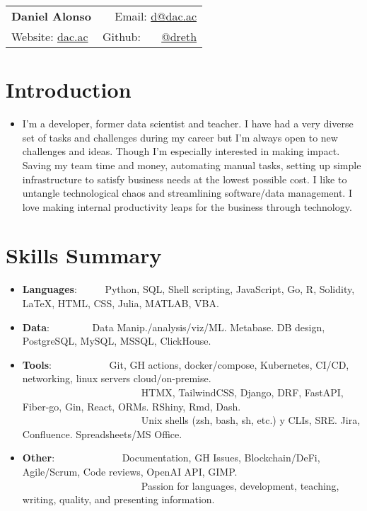 \documentclass[a4paper,20pt]{article}
\newcommand{\resumeItem}[2]{
  \item\small{
    \textbf{#1}{: #2 \vspace{-2pt}}
  }
}
\newcommand{\resumeSubItem}[2]{\resumeItem{#1}{#2}\vspace{-3pt}}
\newcommand{\resumeSubHeadingListStart}{\begin{itemize}[leftmargin=*]}
\newcommand{\resumeSubHeadingListEnd}{\end{itemize}}
\begin{document}
\begin{tabular*}{\textwidth}{l@{\extracolsep{\fill}}r}
  \textbf{{\LARGE Daniel Alonso}} & Email: {\color{blue}\href{mailto:}{d@dac.ac}}\\
  Website: {\color{blue}\href{https://dac.ac}{dac.ac}} & Github: ~~~{\color{blue}\href{https://github.com/dreth}{@dreth}}
\end{tabular*}




            
\vspace{-3pt}
\section{Introduction}
{\begin{itemize} \itemsep-0.24em
\item {I'm a developer, former data scientist and teacher. I have had a very diverse set of tasks and challenges during my career but I'm always open to new challenges and ideas. Though I'm especially interested in making impact. Saving my team time and money, automating manual tasks, setting up simple infrastructure to satisfy business needs at the lowest possible cost. I like to untangle technological chaos and streamlining software/data management. I love making internal productivity leaps for the business through technology.}
\end{itemize}}
        


            
\vspace{-3pt}
\section{Skills Summary}
  \resumeSubHeadingListStart
            
        
\vspace{-1pt}
\resumeSubItem{Languages}{~~~~~Python, SQL, Shell scripting, JavaScript, Go, R, Solidity, LaTeX, HTML, CSS, Julia, MATLAB, VBA.}
\vspace{-1pt}
\resumeSubItem{Data}{~~~~~~~~Data Manip./analysis/viz/ML. Metabase. DB design, PostgreSQL, MySQL, MSSQL, ClickHouse.}
\vspace{-1pt}
\resumeSubItem{Tools}{~~~~~~~~~~~Git, GH actions, docker/compose, Kubernetes, CI/CD, networking, linux servers cloud/on-premise.\\~~~~~~~~~~~~~~~~~~~~~~~~HTMX, TailwindCSS, Django, DRF, FastAPI, Fiber-go, Gin, React, ORMs. RShiny, Rmd, Dash.\\~~~~~~~~~~~~~~~~~~~~~~~~Unix shells (zsh, bash, sh, etc.) y CLIs, SRE. Jira, Confluence. Spreadsheets/MS Office.}
\vspace{-1pt}
\resumeSubItem{Other}{~~~~~~~~~~~~~Documentation, GH Issues, Blockchain/DeFi, Agile/Scrum, Code reviews, OpenAI API, GIMP.\\~~~~~~~~~~~~~~~~~~~~~~~~Passion for languages, development, teaching, writing, quality, and presenting information.}
\resumeSubHeadingListEnd
\end{document}
